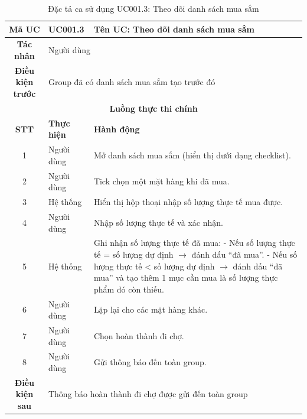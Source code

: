 \begin{table}[H]
    \centering
    \label{tab:uc001-3}
    \begin{tabularx}{\textwidth}{|c|p{3.5cm}|X|}
        \hline
        \rowcolor{headergreen} 
        \textbf{Mã UC} & \textbf{UC001.3} & \textbf{Tên UC: Theo dõi danh sách mua sắm} \\ \hline
        \textbf{Tác nhân} & \multicolumn{2}{l|}{Người dùng} \\ \hline
        \textbf{Điều kiện trước} & \multicolumn{2}{X|}{Group đã có danh sách mua sắm tạo trước đó} \\ \hline
        
        \multicolumn{3}{|c|}{\cellcolor{headerorange}\textbf{Luồng thực thi chính}} \\ \hline
        \rowcolor{graybg} \textbf{STT} & \textbf{Thực hiện} & \textbf{Hành động} \\ \hline
        1 & Người dùng & Mở danh sách mua sắm (hiển thị dưới dạng checklist). \\ \hline
        2 & Người dùng & Tick chọn một mặt hàng khi đã mua. \\ \hline
        3 & Hệ thống & Hiển thị hộp thoại nhập số lượng thực tế mua được. \\ \hline
        4 & Người dùng & Nhập số lượng thực tế và xác nhận. \\ \hline
        5 & Hệ thống & Ghi nhận số lượng thực tế đã mua: \newline
        - Nếu số lượng thực tế = số lượng dự định $\rightarrow$ đánh dấu ``đã mua''. \newline
        - Nếu số lượng thực tế < số lượng dự định $\rightarrow$ đánh dấu ``đã mua'' và tạo thêm 1 mục cần mua là số lượng thực phẩm đó còn thiếu. \\ \hline
        6 & Người dùng & Lặp lại cho các mặt hàng khác. \\ \hline
        7 & Người dùng & Chọn hoàn thành đi chợ. \\ \hline
        8 & Người dùng & Gửi thông báo đến toàn group. \\ \hline
        
        \textbf{Điều kiện sau} & \multicolumn{2}{X|}{Thông báo hoàn thành đi chợ được gửi đến toàn group} \\ \hline
    \end{tabularx}
    \caption{Đặc tả ca sử dụng UC001.3: Theo dõi danh sách mua sắm}
\end{table}

